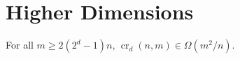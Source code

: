 \documentclass{patmorin}
\DeclareMathOperator{\x}{x}
\DeclareMathOperator{\crs}{cr}
\DeclareMathOperator{\len}{len}
\DeclareMathOperator{\skp}{skip}
\begin{document}
%
%
%

\section{Higher Dimensions}

\begin{thm}
  For all $m\ge 2(2^d-1)n$, $\crs_d(n,m)\in\Omega(m^2/n)$.
\end{thm}
\end{document}

